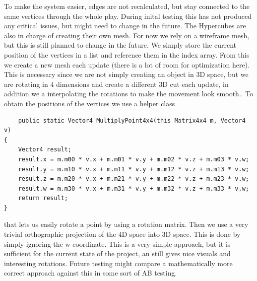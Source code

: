 \documentclass{article}
\begin{document}
To make the system easier, edges are not recalculated, but stay connected to the same vertices through the whole play. During inital testing this has not produced any critical issues, but might need to change in the future.
The Hypercubes are also in charge of creating their own mesh. For now we rely on a wireframe mesh, but this is still planned to change in the future. We simply store the current position of the vertices in a list and reference them in the index array. From this we create a new mesh each update (there is a lot of room for optimization here). This is necessary since we are not simply creating an object in 3D space, but we are rotating in 4 dimensions and create a different 3D cut each update, in addition we a interpolating the rotations to make the movement look smooth..
To obtain the positions of the vertices we use a helper class 
\begin{verbatim}
    public static Vector4 MultiplyPoint4x4(this Matrix4x4 m, Vector4 v)
{
    Vector4 result;
    result.x = m.m00 * v.x + m.m01 * v.y + m.m02 * v.z + m.m03 * v.w;
    result.y = m.m10 * v.x + m.m11 * v.y + m.m12 * v.z + m.m13 * v.w;
    result.z = m.m20 * v.x + m.m21 * v.y + m.m22 * v.z + m.m23 * v.w;
    result.w = m.m30 * v.x + m.m31 * v.y + m.m32 * v.z + m.m33 * v.w;
    return result;
}
\end{verbatim}
that lets us easily rotate a point by using a rotation matrix. Then we use a very trivial orthographic projection of the 4D space into 3D space. This is done by simply ignoring the w coordinate. This is a very simple approach, but it is sufficient for the current state of the project, an still gives nice visuals and interesting rotations. Future testing might compare a mathematically more correct approach against this in some sort of AB testing.
\end{document}
